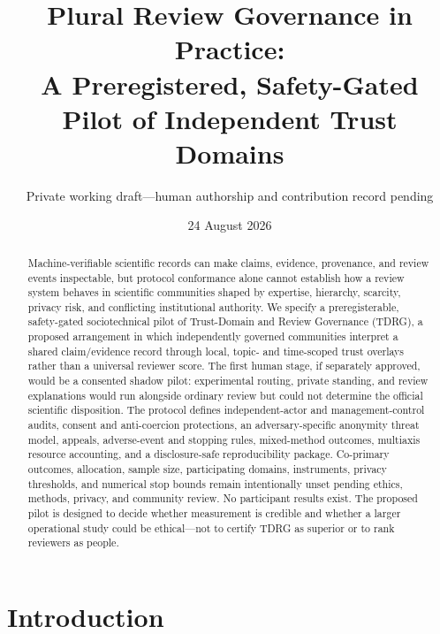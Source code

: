 \documentclass[11pt]{article}
\title{Plural Review Governance in Practice:\\
A Preregistered, Safety-Gated Pilot of Independent Trust Domains}
\author{Private working draft---human authorship and contribution record pending}
\date{24 August 2026}
\newcommand{\tdrg}{TDRG}
\begin{document}
\maketitle


\begin{abstract}
Machine-verifiable scientific records can make claims, evidence, provenance, and
review events inspectable, but protocol conformance alone cannot establish how a
review system behaves in scientific communities shaped by expertise, hierarchy,
scarcity, privacy risk, and conflicting institutional authority. We specify a
preregisterable, safety-gated sociotechnical pilot of Trust-Domain and Review
Governance (\tdrg{}), a proposed arrangement in which independently governed
communities interpret a shared claim/evidence record through local, topic- and
time-scoped trust overlays rather than a universal reviewer score. The first human
stage, if separately approved, would be a consented shadow pilot: experimental
routing, private standing, and review explanations would run alongside ordinary
review but could not determine the official scientific disposition. The protocol
defines independent-actor and management-control audits, consent and anti-coercion
protections, an adversary-specific anonymity threat model, appeals, adverse-event
and stopping rules, mixed-method outcomes, multiaxis resource accounting, and a
disclosure-safe reproducibility package. Co-primary outcomes, allocation, sample
size, participating domains, instruments, privacy thresholds, and numerical stop
bounds remain intentionally unset pending ethics, methods, privacy, and community
review. No participant results exist. The proposed pilot is designed to decide
whether measurement is credible and whether a larger operational study could be
ethical---not to certify \tdrg{} as superior or to rank reviewers as people.
\end{abstract}

\section{Introduction}
\end{document}
